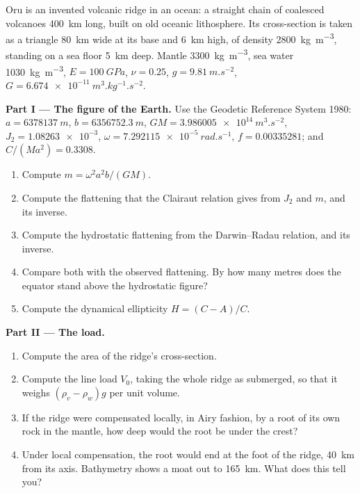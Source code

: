 \begin{problem}
\label{pb:b3:gravity-geodesy:1}
Oru is an invented volcanic ridge in an ocean: a straight chain of coalesced
volcanoes \qty{400}{km} long, built on old oceanic lithosphere. Its
cross-section is taken as a triangle \qty{80}{km} wide at its base and
\qty{6}{km} high, of density \qty{2800}{kg.m^{-3}}, standing on a sea floor
\qty{5}{km} deep. Mantle \qty{3300}{kg.m^{-3}}, sea water
\qty{1030}{kg.m^{-3}}, $E = \qty{100}{GPa}$, $\nu = 0.25$, $g =
\qty{9.81}{m.s^{-2}}$, $G = \qty{6.674e-11}{m^3.kg^{-1}.s^{-2}}$.

\medskip
\noindent\textbf{Part I --- The figure of the Earth.} Use the Geodetic Reference
System 1980: $a = \qty{6378137}{m}$, $b = \qty{6356752.3}{m}$,
$GM = \qty{3.986005e14}{m^3.s^{-2}}$, $J_2 = \num{1.08263e-3}$,
$\omega = \qty{7.292115e-5}{rad.s^{-1}}$, $f = \num{0.00335281}$; and
$C/(Ma^2) = \num{0.3308}$.
\begin{enumerate}
  \item Compute $m = \omega^2a^2b/(GM)$.
  \item Compute the flattening that the Clairaut relation gives from $J_2$ and
        $m$, and its inverse.
  \item Compute the hydrostatic flattening from the Darwin--Radau relation, and
        its inverse.
  \item Compare both with the observed flattening. By how many metres does the
        equator stand above the hydrostatic figure?
  \item Compute the dynamical ellipticity $H = (C - A)/C$.
\end{enumerate}

\noindent\textbf{Part II --- The load.}
\begin{enumerate}[resume]
  \item Compute the area of the ridge's cross-section.
  \item Compute the line load $V_0$, taking the whole ridge as submerged, so
        that it weighs $(\rho_v - \rho_w)g$ per unit volume.
  \item If the ridge were compensated locally, in Airy fashion, by a root of
        its own rock in the mantle, how deep would the root be under the
        crest?
  \item Under local compensation, the root would end at the foot of the ridge,
        \qty{40}{km} from its axis. Bathymetry shows a moat out to
        \qty{165}{km}. What does this tell you?
\end{enumerate}


\end{problem}
